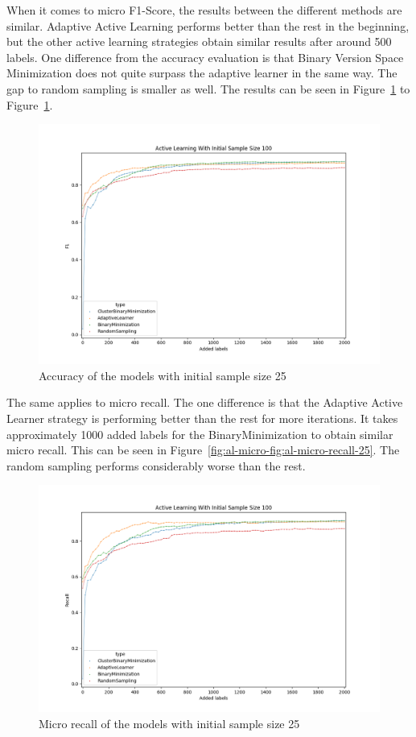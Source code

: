 When it comes to micro F1-Score, the results between the different methods are similar.
Adaptive Active Learning performs better than the rest in the beginning, but the other active learning strategies obtain similar results after around 500 labels.
One difference from the accuracy evaluation is that Binary Version Space Minimization does not quite surpass the adaptive learner in the same way.
The gap to random sampling is smaller as well.
The results can be seen in Figure~\ref{fig:al-micro-f1-25} to Figure~\ref{fig:al-micro-f1-25}.

\begin{figure}
    \centering
    \includegraphics[scale=0.5]{figures/al-25-micro-f1.png}
    \caption{Accuracy of the models with initial sample size 25}
    \label{fig:al-micro-f1-25}
\end{figure}

The same applies to micro recall.
The one difference is that the Adaptive Active Learner strategy is performing better than the rest for more iterations.
It takes approximately 1000 added labels for the BinaryMinimization to obtain similar micro recall.
This can be seen in Figure~\ref{fig:al-micro-fig:al-micro-recall-25}.
The random sampling performs considerably worse than the rest.

\begin{figure}
    \centering
    \includegraphics[scale=0.5]{figures/al-25-micro-recall.png}
    \caption{Micro recall of the models with initial sample size 25}
    \label{fig:al-micro-recall-25}
\end{figure}

